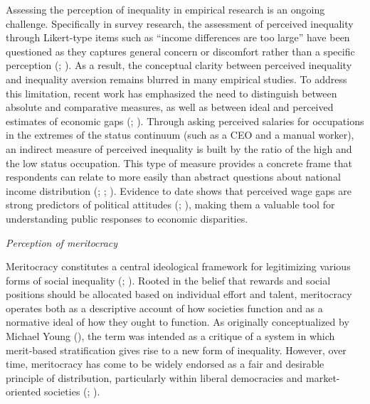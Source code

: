 \documentclass[
  12pt,
]{article}
\begin{document}
Assessing the perception of inequality in empirical research is an
ongoing challenge. Specifically in survey research, the assessment of
perceived inequality through Likert-type items such as ``income
differences are too large'' have been questioned as they captures
general concern or discomfort rather than a specific perception
(;
). As a result, the conceptual clarity between perceived inequality
and inequality aversion remains blurred in many empirical studies. To
address this limitation, recent work has emphasized the need to
distinguish between absolute and comparative measures, as well as
between ideal and perceived estimates of economic gaps
(;
). Through asking perceived salaries for occupations in
the extremes of the status continuum (such as a CEO and a manual
worker), an indirect measure of perceived inequality is built by the
ratio of the high and the low status occupation. This type of measure
provides a concrete frame that respondents can relate to more easily
than abstract questions about national income distribution
(;
;
). Evidence to
date shows that perceived wage gaps are strong predictors of political
attitudes (; ), making them a valuable tool for understanding public responses
to economic disparities.

\emph{Perception of meritocracy}

Meritocracy constitutes a central ideological framework for legitimizing
various forms of social inequality
(;
). Rooted in the belief
that rewards and social positions should be allocated based on
individual effort and talent, meritocracy operates both as a descriptive
account of how societies function and as a normative ideal of how they
ought to function. As originally conceptualized by Michael Young
(), the term was intended as a
critique of a system in which merit-based stratification gives rise to a
new form of inequality. However, over time, meritocracy has come to be
widely endorsed as a fair and desirable principle of distribution,
particularly within liberal democracies and market-oriented societies
(;
).
\end{document}
